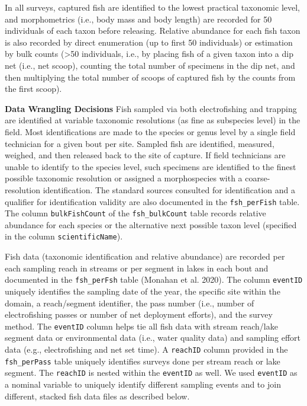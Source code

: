 \documentclass[
  12pt,
]{article}
\begin{document}
In all surveys, captured fish are identified to the lowest practical taxonomic level, and morphometrics (i.e., body mass and body length) are recorded for 50 individuals of each taxon before releasing. Relative abundance for each fish taxon is also recorded by direct enumeration (up to first 50 individuals) or estimation by bulk counts (\textgreater50 individuals, i.e., by placing fish of a given taxon into a dip net (i.e., net scoop), counting the total number of specimens in the dip net, and then multiplying the total number of scoops of captured fish by the counts from the first scoop).

\textbf{Data Wrangling Decisions} Fish sampled via both electrofishing and trapping are identified at variable taxonomic resolutions (as fine as subspecies level) in the field. Most identifications are made to the species or genus level by a single field technician for a given bout per site. Sampled fish are identified, measured, weighed, and then released back to the site of capture. If field technicians are unable to identify to the species level, such specimens are identified to the finest possible taxonomic resolution or assigned a morphospecies with a coarse-resolution identification. The standard sources consulted for identification and a qualifier for identification validity are also documented in the \texttt{fsh\_perFish} table. The column \texttt{bulkFishCount} of the \texttt{fsh\_bulkCount} table records relative abundance for each species or the alternative next possible taxon level (specified in the column \texttt{scientificName}).

Fish data (taxonomic identification and relative abundance) are recorded per each sampling reach in streams or per segment in lakes in each bout and documented in the \texttt{fsh\_perFsh} table (Monahan et al. 2020). The column \texttt{eventID} uniquely identifies the sampling date of the year, the specific site within the domain, a reach/segment identifier, the pass number (i.e., number of electrofishing passes or number of net deployment efforts), and the survey method. The \texttt{eventID} column helps tie all fish data with stream reach/lake segment data or environmental data (i.e., water quality data) and sampling effort data (e.g., electrofishing and net set time). A \texttt{reachID} column provided in the \texttt{fsh\_perPass} table uniquely identifies surveys done per stream reach or lake segment. The \texttt{reachID} is nested within the \texttt{eventID} as well. We used \texttt{eventID} as a nominal variable to uniquely identify different sampling events and to join different, stacked fish data files as described below.
\end{document}
